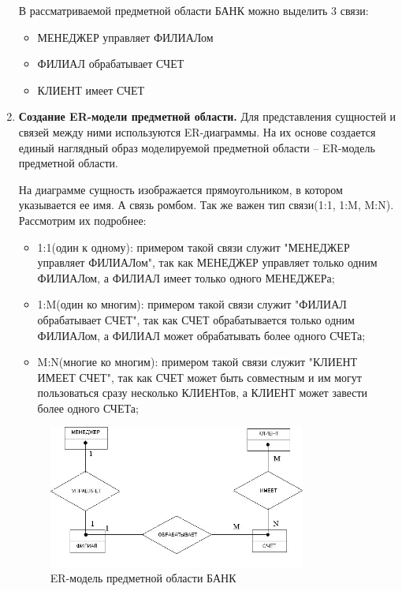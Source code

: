 \begin{enumerate}
	В рассматриваемой предметной области БАНК можно выделить 3 связи:
	\begin{itemize}
		
		\item МЕНЕДЖЕР управляет ФИЛИАЛом
		
		\item ФИЛИАЛ обрабатывает СЧЕТ
		
		\item КЛИЕНТ имеет СЧЕТ
		
	\end{itemize}
	
	\item \textbf{Создание ER-модели предметной области.}
	Для представления сущностей и связей между ними используются ER-диаграммы. На их основе создается единый
	наглядный образ моделируемой предметной области – ER-модель предметной области.
	
	На диаграмме сущность изображается прямоугольником, в
	котором указывается ее имя. А связь ромбом. Так же важен тип связи(1:1, 1:M, M:N). Рассмотрим их подробнее:
	\begin{itemize}
		\item 1:1(один к одному): примером такой связи служит "МЕНЕДЖЕР управляет ФИЛИАЛом", так как МЕНЕДЖЕР управляет только одним ФИЛИАЛом, а ФИЛИАЛ имеет только одного МЕНЕДЖЕРа;
		
		\item 1:M(один ко многим): примером такой связи служит "ФИЛИАЛ  обрабатывает СЧЕТ", так как СЧЕТ обрабатывается только одним ФИЛИАЛом, а ФИЛИАЛ может обрабатывать более одного СЧЕТа;
		
		\item  M:N(многие ко многим): примером такой связи служит "КЛИЕНТ ИМЕЕТ СЧЕТ", так как СЧЕТ может быть совместным и им могут пользоваться сразу несколько КЛИЕНТов, а КЛИЕНТ может завести более одного СЧЕТа;
	\end{itemize}
	\begin{figure}[H]
		\centering
		\includegraphics[width=0.8\textwidth]{assets/security/pic25.png}
		\caption{ER-модель предметной области БАНК}
		\label{fig:mesh28}
	\end{figure}
	

\end{enumerate}
